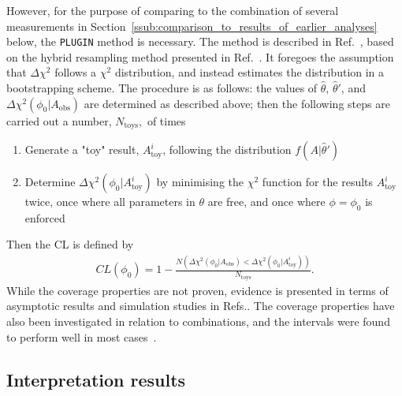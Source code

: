 However, for the purpose of comparing to the combination of several \lhcb measurements in Section~\ref{ssub:comparison_to_results_of_earlier_analyses} below, the \texttt{PLUGIN} method is necessary. The method is described in Ref.~\cite{senUnifiedMethodNuisance2009}, based on the hybrid resampling method presented in Ref.~\cite{chuangResamplingMethodsConfidence1998,*chuangHybridResamplingMethods2000}. It foregoes the assumption that $\Delta \chi^2$ follows a $\chi^2$ distribution, and instead estimates the distribution in a bootstrapping scheme. The procedure is as follows: the values of $\hat \theta$, $\hat \theta'$, and $\Delta \chi^2(\phi_0|A_\mathrm{obs})$ are determined as described above; then the following steps are carried out a number, $N_\mathrm{toys}, $ of times
\begin{enumerate}
    \item Generate a "toy" result, $A^i_\mathrm{toy}$, following the distribution $f(A|\hat\theta')$
    \item Determine $\Delta \chi^2(\phi_0|A^i_\mathrm{toy})$ by minimising the $\chi^2$ function for the results $A^i_\mathrm{toy}$ twice, once where all parameters in $\theta$ are free, and once where $\phi=\phi_0$ is enforced
\end{enumerate}
Then the CL is defined by
\begin{align}
    CL(\phi_0) = 1-\frac{N(\Delta \chi^2(\phi_0|A_\mathrm{obs}) < \Delta \chi^2(\phi_0|A^i_\mathrm{toy}))}{N_\mathrm{toys}}.
\end{align}
While the coverage properties are not proven, evidence is presented in terms of asymptotic results and simulation studies in Refs.\cite{senUnifiedMethodNuisance2009,chuangResamplingMethodsConfidence1998,*chuangHybridResamplingMethods2000}. The coverage properties have also been investigated in relation to \lhcb combinations, and the intervals were found to perform well in most cases~\cite{LHCb-PAPER-2016-032}.

\subsection{Interpretation results} %
\label{sub:interpretation_results}


